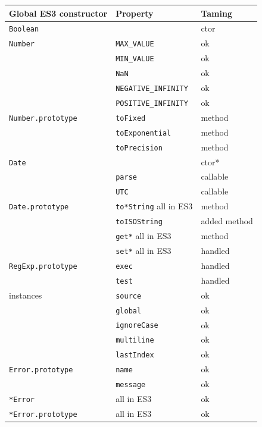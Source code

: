 \documentclass[letterpaper,twocolumn,10pt]{article}
\newcommand{\code}[1]{{\tt {#1}}}              %
\begin{document}
\begin{figure}
\begin{tabular}{lll}
  Global ES3 constructor  & Property                    & Taming \\
  \hline 
  \code{Boolean}          &                             & ctor \\
  \hline
  \code{Number}           & \code{MAX\_VALUE}           & ok \\
                          & \code{MIN\_VALUE}           & ok \\
                          & \code{NaN}                  & ok \\
                          & \code{NEGATIVE\_INFINITY}   & ok \\
                          & \code{POSITIVE\_INFINITY}   & ok \\
  \code{Number.prototype} & \code{toFixed}              & method \\
                          & \code{toExponential}        & method \\
                          & \code{toPrecision}          & method \\
  \hline
  \code{Date}             &                             & ctor* \\
                          & \code{parse}                & callable \\
                          & \code{UTC}                  & callable \\
  \code{Date.prototype}   & \code{to*String} all in ES3 & method \\
                          & \code{toISOString}          & added method \\
                          & \code{get*}      all in ES3 & method \\
                          & \code{set*}      all in ES3 & handled \\
  \hline
  \code{RegExp.prototype} & \code{exec}                 & handled \\
                          & \code{test}                 & handled \\
  instances               & \code{source}               & ok \\
                          & \code{global}               & ok \\
                          & \code{ignoreCase}           & ok \\
                          & \code{multiline}            & ok \\
                          & \code{lastIndex}            & ok \\
  \hline 
  \code{Error.prototype}  & \code{name}                 & ok \\
                          & \code{message}              & ok \\
  \code{*Error}           &                  all in ES3 & ok \\
  \code{*Error.prototype} &                  all in ES3 & ok \\
  

\end{tabular}
\end{figure}
\end{document}
